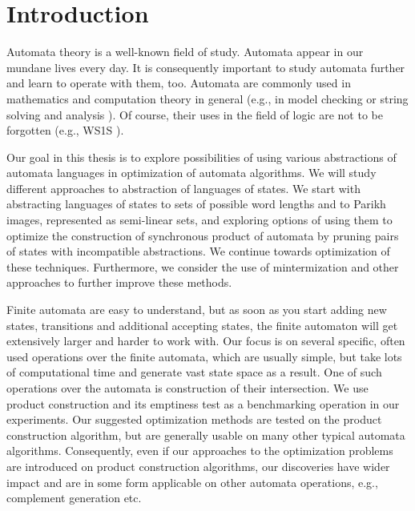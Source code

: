 \chapter{Introduction}


Automata theory is a well-known field of study. Automata appear in our mundane lives every day. It is consequently important to study automata further and learn to operate with them, too. Automata are commonly used in mathematics and computation theory in general (e.g., in model checking \cite{DBLP:conf/cav/SiegelY20} or string solving and analysis \cite{DBLP:conf/popl/LinB16}). Of course, their uses in the field of logic are not to be forgotten (e.g., WS1S \cite{DBLP:conf/tacas/FiedorHJLV17, DBLP:journals/acta/FiedorHLV19}).

Our goal in this thesis is to explore possibilities of using various abstractions of automata languages in optimization of automata algorithms. We will study different approaches to abstraction of languages of states. We start with abstracting languages of states to sets of possible word lengths and to Parikh images, represented as semi-linear sets, and exploring options of using them to optimize the construction of synchronous product of automata by pruning pairs of states with incompatible abstractions. We continue towards optimization of these techniques. Furthermore, we consider the use of mintermization and other approaches to further improve these methods.

Finite automata are easy to understand, but as soon as you start adding new states, transitions and additional accepting states, the finite automaton will get extensively larger and harder to work with.
Our focus is on several specific, often used operations over the finite automata, which are usually simple, but take lots of computational time and generate vast state space as a result. One of such operations over the automata is construction of their intersection. We use product construction and its emptiness test as a benchmarking operation in our experiments. Our suggested optimization methods are tested on the product construction algorithm, but are generally usable on many other typical automata algorithms. Consequently, even if our approaches to the optimization problems are introduced on product construction algorithms, our discoveries have wider impact and are in some form applicable on other automata operations, e.g., complement generation etc.

